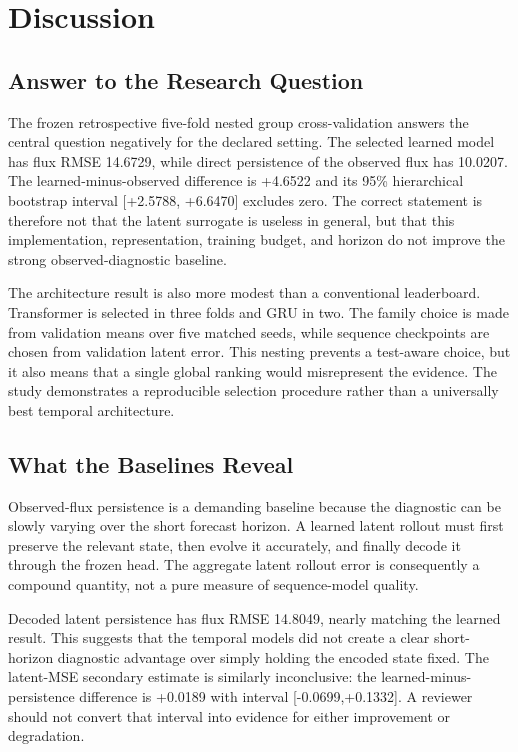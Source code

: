 \cleardoubleoddpage
\chapter{Discussion}
\label{chap:discussion}

\section{Answer to the Research Question}

The frozen retrospective five-fold nested group cross-validation answers the central question
negatively for the declared setting. The selected learned model has flux RMSE 14.6729, while direct
persistence of the observed flux has 10.0207. The learned-minus-observed difference is +4.6522 and
its 95\% hierarchical bootstrap interval [+2.5788, +6.6470] excludes zero. The correct statement
is therefore not that the latent surrogate is useless in general, but that this implementation,
representation, training budget, and horizon do not improve the strong observed-diagnostic
baseline.

The architecture result is also more modest than a conventional leaderboard. Transformer is
selected in three folds and GRU in two. The family choice is made from validation means over five
matched seeds, while sequence checkpoints are chosen from validation latent error. This nesting
prevents a test-aware choice, but it also means that a single global ranking would misrepresent the
evidence. The study demonstrates a reproducible selection procedure rather than a universally best
temporal architecture.

\section{What the Baselines Reveal}

Observed-flux persistence is a demanding baseline because the diagnostic can be slowly varying
over the short forecast horizon. A learned latent rollout must first preserve the relevant state,
then evolve it accurately, and finally decode it through the frozen head. The aggregate latent
rollout error is consequently a compound quantity, not a pure measure of sequence-model quality.

Decoded latent persistence has flux RMSE 14.8049, nearly matching the learned result. This suggests
that the temporal models did not create a clear short-horizon diagnostic advantage over simply
holding the encoded state fixed. The latent-MSE secondary estimate is similarly inconclusive:
the learned-minus-persistence difference is +0.0189 with interval [-0.0699,+0.1332]. A reviewer
should not convert that interval into evidence for either improvement or degradation.

